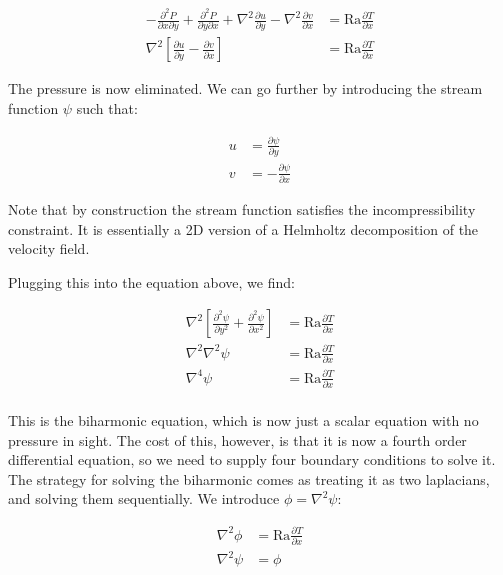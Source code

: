 \documentclass[a4paper,10pt]{article}
\begin{document}
\begin{equation}
\begin{aligned}
-\frac{\partial^2 P}{\partial x \partial y} + \frac{\partial^2 P}{\partial y \partial x}  + \nabla^2 \frac{\partial u}{\partial y} - \nabla^2 \frac{\partial v}{\partial x} &= \mathrm{Ra} \frac{\partial{T}}{\partial x} \\
\nabla^2 \left[ \frac{\partial u}{\partial y} - \frac{\partial v}{\partial x} \right] &= \mathrm{Ra} \frac{\partial{T}}{\partial x}
\end{aligned}
\end{equation} 

The pressure is now eliminated.  We can go further by introducing the stream function $\psi$ such that:

\begin{equation}
\begin{aligned}
u &= \frac{\partial \psi}{\partial y} \\
v &= -\frac{\partial \psi}{\partial x}
\end{aligned}
\end{equation}

Note that by construction the stream function satisfies the incompressibility constraint.  It is essentially a 2D version of a Helmholtz decomposition of the velocity field.

Plugging this into the equation above, we find:

\begin{equation}
\begin{aligned}
\nabla^2 \left[ \frac{\partial^2 \psi}{\partial y^2} + \frac{\partial^2 \psi}{\partial x^2} \right] &= \mathrm{Ra} \frac{\partial{T}}{\partial x} \\
\nabla^2 \nabla^2 \psi &= \mathrm{Ra} \frac{\partial{T}}{\partial x} \\
\nabla^4 \psi &= \mathrm{Ra} \frac{\partial{T}}{\partial x} \\
\end{aligned}
\end{equation}

This is the biharmonic equation, which is now just a scalar equation with no pressure in sight.  
The cost of this, however, is that it is now a fourth order differential equation, so we need to supply four boundary conditions to solve it.
The strategy for solving the biharmonic comes as treating it as two laplacians, and solving them sequentially.  We introduce $\phi = \nabla^2 \psi$:

\begin{equation}
\begin{aligned}
\nabla^2 \phi &= \mathrm{Ra} \frac{\partial T}{\partial x} \\
\nabla^2 \psi &= \phi
\end{aligned}
\end{equation}
\end{document}
